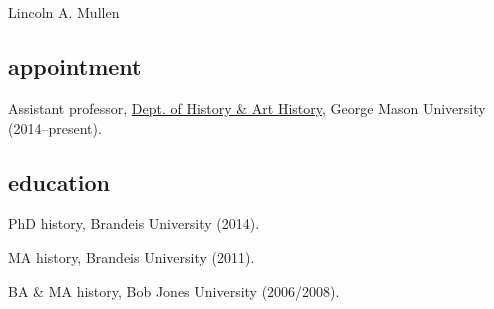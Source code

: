 \documentclass[11pt]{article}
\begin{document}
\thispagestyle{fancy}
\fancyfoot{}
\fancyhead{}
\renewcommand{\headrulewidth}{0pt}

\hfill\hfill\hfill
\hfill\hfill\hfill
\hfill\hfill\hfill
\hfill\hfill\hfill
\begin{minipage}[t]{1.6in}
   \\
   \\
\end{minipage}
\hfill
\begin{minipage}[t]{1.9in}
\end{minipage}

\vspace{0.1in}

{\Large Lincoln A. Mullen}\\[-0.1in]

\subsection{appointment}\label{appointment}

Assistant professor, \href{http://historyarthistory.gmu.edu/}{Dept.
  of History \& Art History}, George Mason University (2014--present).


\subsection{education}\label{education}

PhD history, Brandeis University (2014). 

MA history, Brandeis University (2011).

BA \& MA history, Bob Jones University (2006/2008).
\end{document}
